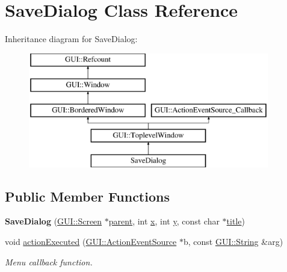 \hypertarget{classSaveDialog}{\section{Save\-Dialog Class Reference}
\label{classSaveDialog}
}
Inheritance diagram for Save\-Dialog\-:\begin{figure}[H]
\begin{center}
\leavevmode
\includegraphics[height=5.000000cm]{classSaveDialog}
\end{center}
\end{figure}
\subsection*{Public Member Functions}
\begin{DoxyCompactItemize}
\item 
\hypertarget{classSaveDialog_a0b63b5fc1b451512ccf0f208406fca3a}{{\bfseries Save\-Dialog} (\hyperlink{classGUI_1_1Screen}{G\-U\-I\-::\-Screen} $\ast$\hyperlink{classGUI_1_1Window_a2e593ff65e7702178d82fe9010a0b539}{parent}, int \hyperlink{classGUI_1_1Window_a6ca6a80ca00c9e1d8ceea8d3d99a657d}{x}, int \hyperlink{classGUI_1_1Window_a0ee8e923aff2c3661fc2e17656d37adf}{y}, const char $\ast$\hyperlink{classGUI_1_1ToplevelWindow_a04de191f9a57b5b584657866a4ac6843}{title})}\label{classSaveDialog_a0b63b5fc1b451512ccf0f208406fca3a}

\item 
\hypertarget{classSaveDialog_af7dc3bd044aa8a69ae430faf64430058}{void \hyperlink{classSaveDialog_af7dc3bd044aa8a69ae430faf64430058}{action\-Executed} (\hyperlink{classGUI_1_1ActionEventSource}{G\-U\-I\-::\-Action\-Event\-Source} $\ast$b, const \hyperlink{classGUI_1_1String}{G\-U\-I\-::\-String} \&arg)}\label{classSaveDialog_af7dc3bd044aa8a69ae430faf64430058}

\begin{DoxyCompactList}\small\item\em Menu callback function. \end{DoxyCompactList}\end{DoxyCompactItemize}
